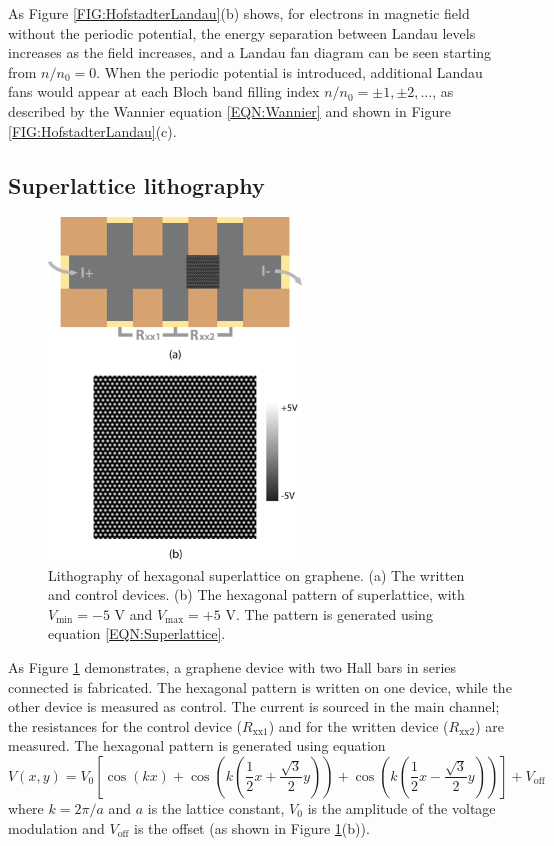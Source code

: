 \documentclass[pdflatex, sectionletters, 12pt]{pittetd}    %
\begin{document}
As Figure \ref{FIG:HofstadterLandau}(b) shows, for electrons in magnetic field without the periodic potential, the energy separation between Landau levels increases as the field increases, and a Landau fan diagram can be seen starting from $n/n_0 = 0$. When the periodic potential is introduced, additional Landau fans would appear at each Bloch band filling index $n/n_0 = \pm 1, \pm 2, \ldots$, as described by the Wannier equation \ref{EQN:Wannier} and shown in Figure \ref{FIG:HofstadterLandau}(c). 

\subsection{Superlattice lithography}

\begin{figure}[h!]
	\centering
	\includegraphics[width=0.6\textwidth]{Drawing/SuperlatticeWriting.pdf}
	\caption{Lithography of hexagonal superlattice on graphene. (a) The written and control devices. (b) The hexagonal pattern of superlattice, with $V_\mathrm{min} = -5$ V and $V_\mathrm{max} = +5$ V. The pattern is generated using equation \ref{EQN:Superlattice}.}
	\label{FIG:SuperlatticeWriting}
\end{figure}

As Figure \ref{FIG:SuperlatticeWriting} demonstrates, a graphene device with two Hall bars in series connected is fabricated. The hexagonal pattern is written on one device, while the other device is measured as control. The current is sourced in the main channel; the resistances for the control device ($R_\mathrm{xx1}$) and for the written device ($R_\mathrm{xx2}$) are measured. The hexagonal pattern is generated using equation
\begin{equation}
\label{EQN:Superlattice}
V(x, y) = V_0 \left[\cos(kx) + \cos\left( k \left( \frac{1}{2}  x + \frac{\sqrt{3}}{2} y \right) \right) + \cos \left( k \left( \frac{1}{2} x - \frac{\sqrt{3}}{2} y \right) \right) \right] + V_\mathrm{off}
\end{equation}
where $k = 2\pi/a$ and $a$ is the lattice constant, $V_0$ is the amplitude of the voltage modulation and $V_\mathrm{off}$ is the offset (as shown in Figure \ref{FIG:SuperlatticeWriting}(b)). 
\end{document}
